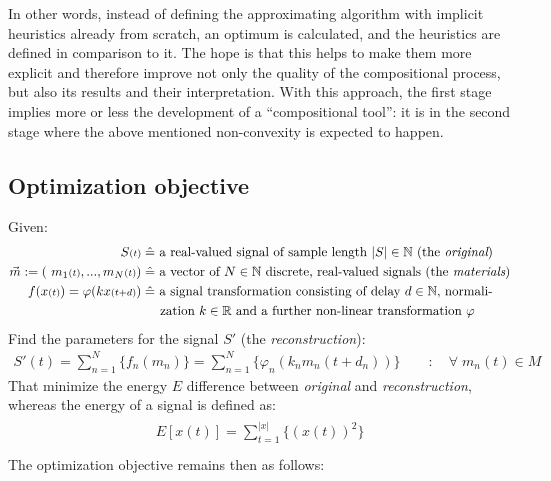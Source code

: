 \documentclass[11pt]{scrartcl} %
\begin{document}
In other words, instead of defining the approximating algorithm with implicit heuristics already from scratch, an optimum is calculated, and the heuristics are defined in comparison to it. The hope is that this helps to make them more explicit and therefore improve not only the quality of the compositional process, but also its results and their interpretation. With this approach, the first stage implies more or less the development of a ``compositional tool'': it is in the second stage where the above mentioned non-convexity is expected to happen.
\subsection*{Optimization objective}
Given:
\begin{align*}
    \begin{aligned}
      S{\scriptstyle (t)} \;&\hat{=} \text{ a real-valued signal of sample length } |S| \in \mathbb{N} \text{ (the {\it original})}\\
      \vec{m} := (\ m_1{\scriptstyle (t)}, ..., m_N{\scriptstyle (t)}) \;&\hat{=} \text{ a vector of \(N\in\mathbb{N}\) discrete, real-valued signals (the {\it materials})}\\
      f(x{\scriptstyle (t)}) = \varphi(kx{\scriptstyle (t+d)}) \;&\hat{=} \text{ a signal transformation consisting of delay } d\in\mathbb{N} \text{, normali-}\\
        &\phantom{\quad\,}\text{zation } k\in\mathbb{R} \text{ and a further non-linear transformation } \varphi \notag\\ %
    \end{aligned}
\end{align*}
Find the parameters for the signal \(S'\) (the {\it reconstruction}):
  \begin{align*}
    S'{\scriptstyle (t)} = \sum_{n=1}^N\{f_n(m_n)\} = \sum_{n=1}^N\{\varphi_n(k_nm_n{\scriptstyle (t+d_n)})\}\qquad : \quad \forall\; m_n{\scriptstyle (t)}  \in M
  \end{align*}
  That minimize the energy \(E\) difference between {\it original} and {\it reconstruction}, whereas the energy of a signal is defined as:
  \begin{align*}
    \begin{aligned}
      E[x{\scriptstyle (t)}] = \sum_{t=1}^{|x|}\{(x{\scriptstyle (t)})^2\}\\[15pt]
    \end{aligned}
  \end{align*}
  The optimization objective remains then as follows:
\end{document}
